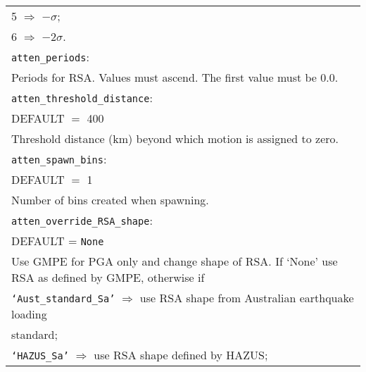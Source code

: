 \begin{tabular}{|p{\textwidth}|}
 \hspace{0.5em} 5 $\Rightarrow$ $-\sigma$; \\
 \hspace{0.5em} 6 $\Rightarrow$ $-2\sigma$.\\
\hline \vspace{0.1em} \texttt{atten\_periods}: \\
Periods for RSA. Values must ascend. The first value must be 0.0.\\
\vspace{0.1em} \texttt{atten\_threshold\_distance}: \\
DEFAULT $=$ 400 \\
Threshold distance (km) beyond which motion is assigned to zero. \\
\vspace{0.1em} \texttt{atten\_spawn\_bins}: \\
DEFAULT $=$ 1 \\
Number of bins created when spawning. \\
\hline \vspace{0.1em} \texttt{atten\_override\_RSA\_shape}: \\
DEFAULT = \texttt{None} \\
Use GMPE for PGA only and change shape of RSA. If `None' use RSA
as defined by GMPE, otherwise if\\
 \hspace{0.5em} \texttt{`Aust\_standard\_Sa'} $\Rightarrow$
use RSA shape from Australian earthquake loading \\
\hspace{11em} standard; \\
 \hspace{0.5em} \texttt{`HAZUS\_Sa'}  $\Rightarrow$ use RSA shape defined by HAZUS;\\
\hline
\end{tabular}

